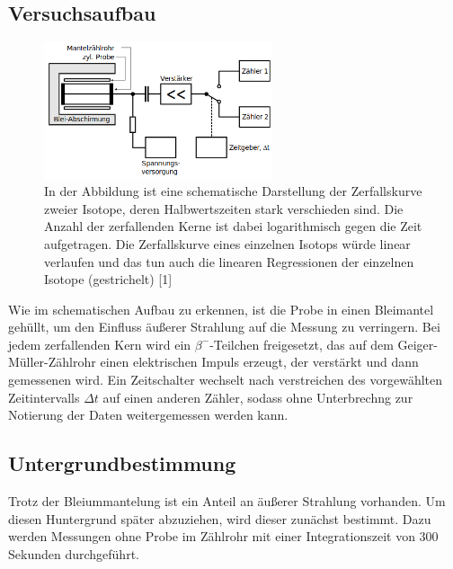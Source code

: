 \documentclass[titlepage = firstcover]{scrartcl}
\begin{document}
        \subsection{Versuchsaufbau}

            \FloatBarrier

            \begin{figure}[h]
              \centering
              \includegraphics[width = 0.6\textwidth]{Bilder/Aufbau.png}
              \caption{In der Abbildung ist eine schematische Darstellung der Zerfallskurve zweier Isotope, deren Halbwertszeiten stark verschieden sind. Die Anzahl der zerfallenden Kerne ist dabei logarithmisch gegen die Zeit aufgetragen. Die Zerfallskurve eines einzelnen Isotops würde linear verlaufen und das tun auch die linearen Regressionen der einzelnen Isotope (gestrichelt)  [1]}
              \label{fig:Aufbau}
            \end{figure}

            \FloatBarrier

            \noindent
            Wie im schematischen Aufbau zu erkennen, ist die Probe in einen Bleimantel gehüllt, um den Einfluss äußerer Strahlung auf die Messung zu verringern. Bei jedem zerfallenden Kern wird ein
            $\beta^-$-Teilchen freigesetzt, das auf dem Geiger-Müller-Zählrohr einen elektrischen Impuls erzeugt, der verstärkt und dann gemessenen wird. Ein Zeitschalter wechselt nach verstreichen
            des vorgewählten Zeitintervalls $\Delta t$ auf einen anderen Zähler, sodass ohne Unterbrechng zur Notierung der Daten weitergemessen werden kann.

        \subsection{Untergrundbestimmung}
            Trotz der Bleiummantelung ist ein Anteil an äußerer Strahlung vorhanden. Um diesen Huntergrund später abzuziehen, wird dieser zunächst bestimmt. Dazu werden Messungen ohne Probe im 
            Zählrohr mit einer Integrationszeit von 300 Sekunden durchgeführt.
\end{document}
